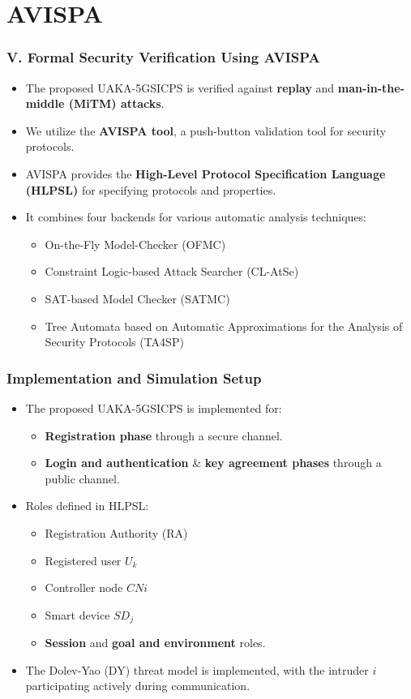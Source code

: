 \documentclass[9pt,handout]{beamer}
\begin{document}
\section{AVISPA}
\begin{frame}
    \frametitle{V. Formal Security Verification Using AVISPA}
    \begin{itemize}
        \item The proposed UAKA-5GSICPS is verified against \textbf{replay} and \textbf{man-in-the-middle (MiTM) attacks}.
        \item We utilize the \textbf{AVISPA tool}, a push-button validation tool for security protocols.
        \item AVISPA provides the \textbf{High-Level Protocol Specification Language (HLPSL)} for specifying protocols and properties.
        \item It combines four backends for various automatic analysis techniques:
            \begin{itemize}
                \item On-the-Fly Model-Checker (OFMC)
                \item Constraint Logic-based Attack Searcher (CL-AtSe)
                \item SAT-based Model Checker (SATMC)
                \item Tree Automata based on Automatic Approximations for the Analysis of Security Protocols (TA4SP)
            \end{itemize}
    \end{itemize}
\end{frame}
\begin{frame}
    \frametitle{Implementation and Simulation Setup}
    \begin{itemize}
        \item The proposed UAKA-5GSICPS is implemented for:
            \begin{itemize}
                \item \textbf{Registration phase} through a secure channel.
                \item \textbf{Login and authentication} & \textbf{key agreement phases} through a public channel.
            \end{itemize}
        \item Roles defined in HLPSL:
            \begin{itemize}
                \item Registration Authority (RA)
                \item Registered user \( U_k \)
                \item Controller node \( CNi \)
                \item Smart device \( SD_j \)
                \item \textbf{Session} and \textbf{goal and environment} roles.
            \end{itemize}
        \item The Dolev-Yao (DY) threat model is implemented, with the intruder \( i \) participating actively during communication.
    \end{itemize}
\end{frame}
\end{document}

